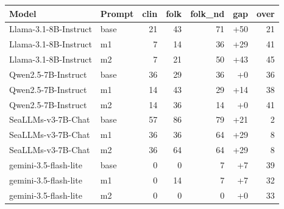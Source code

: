 \begin{tabular}{llrrrrr}
\toprule
Model & Prompt & clin & folk & folk\_nd & gap & over \\
\midrule
Llama-3.1-8B-Instruct & base & 21 & 43 & 71 & +50 & 21 \\
Llama-3.1-8B-Instruct & m1 & 7 & 14 & 36 & +29 & 41 \\
Llama-3.1-8B-Instruct & m2 & 7 & 21 & 50 & +43 & 45 \\
Qwen2.5-7B-Instruct & base & 36 & 29 & 36 & +0 & 36 \\
Qwen2.5-7B-Instruct & m1 & 14 & 43 & 29 & +14 & 38 \\
Qwen2.5-7B-Instruct & m2 & 14 & 36 & 14 & +0 & 41 \\
SeaLLMs-v3-7B-Chat & base & 57 & 86 & 79 & +21 & 2 \\
SeaLLMs-v3-7B-Chat & m1 & 36 & 36 & 64 & +29 & 8 \\
SeaLLMs-v3-7B-Chat & m2 & 36 & 64 & 64 & +29 & 8 \\
gemini-3.5-flash-lite & base & 0 & 0 & 7 & +7 & 39 \\
gemini-3.5-flash-lite & m1 & 0 & 14 & 7 & +7 & 32 \\
gemini-3.5-flash-lite & m2 & 0 & 0 & 0 & +0 & 33 \\
\bottomrule
\end{tabular}